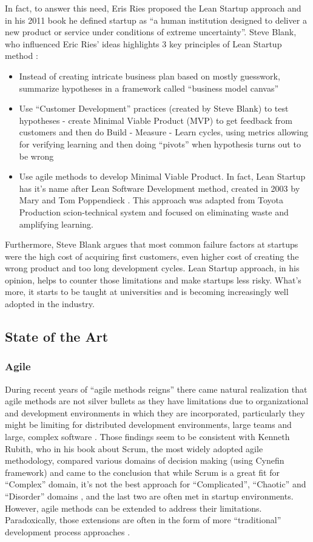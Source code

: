 \documentclass{article}
\begin{document}
In fact, to answer this need, Eris Ries proposed the Lean Startup approach and in his 2011 book he defined startup as ``a human institution designed to deliver a new product or service under conditions of extreme uncertainty''\cite{ries2011lean}. Steve Blank, who influenced Eric Ries' ideas highlights 3 key principles of Lean Startup method \cite{blank2013lean}:
\begin{itemize}
  \item Instead of creating intricate business plan based on mostly guesswork, summarize hypotheses in a framework called ``business model canvas''
  \item Use ``Customer Development'' practices (created by Steve Blank) to test hypotheses - create Minimal Viable Product (MVP) to get feedback from customers and then do Build - Measure - Learn cycles, using metrics allowing for verifying learning and then doing ``pivots'' when hypothesis turns out to be wrong
  \item Use agile methods to develop Minimal Viable Product. In fact, Lean Startup has it's name after Lean Software Development method, created in 2003 by Mary and Tom Poppendieck \cite{poppendieck2003lean}. This approach was adapted from Toyota Production scion-technical system and focused on eliminating waste and amplifying learning.
\end{itemize}

Furthermore, Steve Blank argues that most common failure factors at startups were the high cost of acquiring first customers, even higher cost of creating the wrong product and too long development cycles. Lean Startup approach, in his opinion, helps to counter those limitations and make startups less risky. What's more, it starts to be taught at universities and is becoming increasingly well adopted in the industry.

\subsection{State of the Art}
\subsubsection{Agile}
During recent years of ``agile methods reigns'' there came natural realization that agile methods are not silver bullets as they have limitations due to organizational and development environments in which they are incorporated, particularly they might be limiting for distributed development environments, large teams and large, complex software \cite{turk2014assumptions}. Those findings seem to be consistent with Kenneth Rubith, who in his book about Scrum, the most widely adopted agile methodology, compared various domains of decision making (using Cynefin framework) and came to the conclusion that while Scrum is a great fit for ``Complex'' domain, it's not the best approach for ``Complicated'', ``Chaotic'' and ``Disorder'' domains \cite{rubin2012essential}, and the last two are often met in startup environments. However, agile methods can be extended to address their limitations. Paradoxically, those extensions are often in the form of more ``traditional'' development process approaches \cite{turk2014limitations}.
\end{document}

